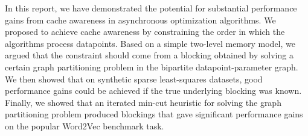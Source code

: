 \documentclass[times,11pt]{article}
\numberwithin{equation}{section}		%
\numberwithin{figure}{section}			%
\numberwithin{table}{section}				%
\begin{document}




In this report, we have demonstrated the potential for substantial performance gains from cache awareness in asynchronous optimization algorithms. We proposed
to achieve cache awareness by constraining the order in which the algorithms process datapoints. Based on a simple two-level memory model, we argued that the constraint
should come from a blocking obtained by solving a certain graph partitioning problem in the bipartite datapoint-parameter graph. We then showed that on synthetic sparse least-squares
datasets, good performance gains could be achieved if the true underlying blocking was known. Finally, we showed that an iterated min-cut heuristic for solving the graph partitioning problem
produced blockings that gave significant performance gains on the popular Word2Vec benchmark task.
\end{document}
